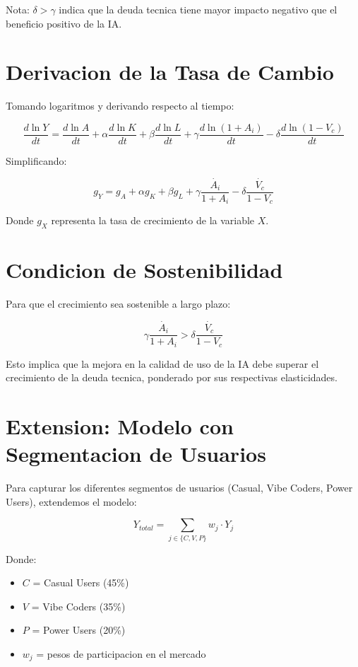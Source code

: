 \documentclass{article}
\begin{document}
Nota: $\delta > \gamma$ indica que la deuda tecnica tiene mayor impacto negativo que el beneficio positivo de la IA.

\section{Derivacion de la Tasa de Cambio}

Tomando logaritmos y derivando respecto al tiempo:

\begin{equation}
\frac{d \ln Y}{dt} = \frac{d \ln A}{dt} + \alpha \frac{d \ln K}{dt} + \beta \frac{d \ln L}{dt} + \gamma \frac{d \ln (1 + A_i)}{dt} - \delta \frac{d \ln (1 - V_c)}{dt}
\end{equation}

Simplificando:

\begin{equation}
g_Y = g_A + \alpha g_K + \beta g_L + \gamma \frac{\dot{A_i}}{1 + A_i} - \delta \frac{\dot{V_c}}{1 - V_c}
\end{equation}

Donde $g_X$ representa la tasa de crecimiento de la variable $X$.

\section{Condicion de Sostenibilidad}

Para que el crecimiento sea sostenible a largo plazo:

\begin{equation}
\gamma \frac{\dot{A_i}}{1 + A_i} > \delta \frac{\dot{V_c}}{1 - V_c}
\end{equation}

Esto implica que la mejora en la calidad de uso de la IA debe superar el crecimiento de la deuda tecnica, ponderado por sus respectivas elasticidades.

\section{Extension: Modelo con Segmentacion de Usuarios}

Para capturar los diferentes segmentos de usuarios (Casual, Vibe Coders, Power Users), extendemos el modelo:

\begin{equation}
Y_{total} = \sum_{j \in \{C, V, P\}} w_j \cdot Y_j
\end{equation}

Donde:
\begin{itemize}
    \item $C$ = Casual Users (45\%)
    \item $V$ = Vibe Coders (35\%)
    \item $P$ = Power Users (20\%)
    \item $w_j$ = pesos de participacion en el mercado
\end{itemize}
\end{document}
